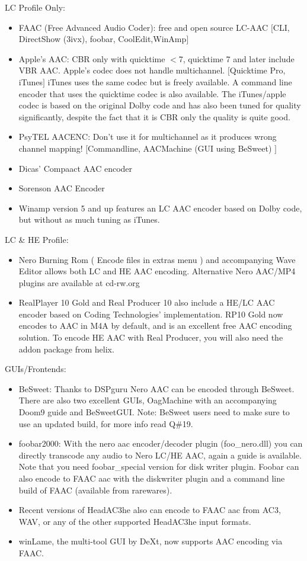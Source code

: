 ﻿\documentclass[12pt]{article}
\begin{document}
LC Profile Only:
\begin{itemize}
  \item FAAC (Free Advanced Audio Coder): free and open source LC-AAC $[$CLI, DirectShow (3ivx), foobar, CoolEdit,WinAmp$]$
  \item Apple's AAC: CBR only with quicktime $<$7, quicktime 7 and later include VBR AAC. Apple's codec does not handle multichannel. $[$Quicktime Pro, iTunes$]$ iTunes uses the same codec but is freely available. A command line encoder that uses the quicktime codec is also available. The iTunes/apple codec is based on the original Dolby code and has also been tuned for quality significantly, despite the fact that it is CBR only the quality is quite good.
  \item PsyTEL AACENC: Don't use it for multichannel as it produces wrong channel mapping! $[$Commandline, AACMachine (GUI using BeSweet) $]$
  \item Dicas' Compaact AAC encoder
  \item Sorenson AAC Encoder
  \item Winamp version 5 and up features an LC AAC encoder based on Dolby code, but without as much tuning as iTunes.
\end{itemize}

LC \& HE Profile:
\begin{itemize}
  \item Nero Burning Rom ( Encode files in extras menu ) and accompanying Wave Editor allows both LC and HE AAC encoding. Alternative Nero AAC/MP4 plugins are available at cd-rw.org
  \item RealPlayer 10 Gold and Real Producer 10 also include a HE/LC AAC encoder based on Coding Technologies' implementation. RP10 Gold now encodes to AAC in M4A by default, and is an excellent free AAC encoding solution. To encode HE AAC with Real Producer, you will also need the addon package from helix.
\end{itemize}

GUIs/Frontends:
\begin{itemize}
  \item BeSweet: Thanks to DSPguru Nero AAC can be encoded through BeSweet. There are also two excellent GUIs, OagMachine with an accompanying Doom9 guide and BeSweetGUI. Note: BeSweet users need to make sure to use an updated build, for more info read Q\#19.
  \item foobar2000: With the nero aac encoder/decoder plugin (foo\_nero.dll) you can directly transcode any audio to Nero LC/HE AAC, again a guide is available. Note that you need foobar\_special version for disk writer plugin. Foobar can also encode to FAAC aac with the diskwriter plugin and a command line build of FAAC (available from rarewares).
  \item Recent versions of HeadAC3he also can encode to FAAC aac from AC3, WAV, or any of the other supported HeadAC3he input formats.
  \item winLame, the multi-tool GUI by DeXt, now supports AAC encoding via FAAC.
\end{itemize}
\end{document}
